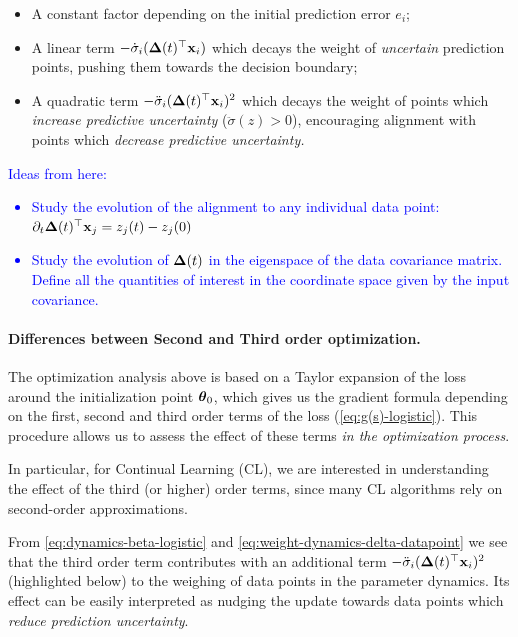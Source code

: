 \documentclass{article} %
\begin{document}
\begin{itemize}
    \item A constant factor depending on the initial prediction error $e_i$; 
    \item A linear term $- \dot\sigma_i (\mbox{$\mbox{$\boldsymbol{\Delta}$}$}(t)^\top \mbox{$\mbox{$\mathbf{x}$}$}_i)$ which decays the weight of \emph{uncertain} prediction points, pushing them towards the decision boundary;
    \item A quadratic term $- \ddot\sigma_i (\mbox{$\mbox{$\boldsymbol{\Delta}$}$}(t)^\top \mbox{$\mbox{$\mathbf{x}$}$}_i)^2$ which decays the weight of points which \emph{increase predictive uncertainty} ($\ddot\sigma(z)>0$), encouraging alignment with points which \emph{decrease predictive uncertainty.}
\end{itemize}

\textcolor{blue}{Ideas from here: 
\begin{itemize}
    \item Study the evolution of the alignment to any individual data point: $\partial_t \mbox{$\mbox{$\boldsymbol{\Delta}$}$}(t)^\top\mbox{$\mbox{$\mathbf{x}$}$}_j = z_j(t) - z_j(0)$
    \item Study the evolution of $\mbox{$\mbox{$\boldsymbol{\Delta}$}$}(t)$ in the eigenspace of the data covariance matrix. Define all the quantities of interest in the coordinate space given by the input covariance. 
\end{itemize}
}


\paragraph{Differences between Second and Third order optimization.}
The optimization analysis above is based on a Taylor expansion of the loss around the initialization point $\mbox{$\mbox{$\boldsymbol{\theta}$}$}_0$, which gives us the gradient formula depending on the first, second and third order terms of the loss (\cref{eq:g(s)-logistic}). This procedure allows us to assess the effect of these terms \emph{in the optimization process}. 

In particular, for Continual Learning (CL), we are interested in understanding the effect of the third (or higher) order terms, since many CL algorithms rely on second-order approximations.

From \cref{eq:dynamics-beta-logistic} and \cref{eq:weight-dynamics-delta-datapoint} we see that the third order term contributes with an additional term $ - \ddot\sigma_i  (\mbox{$\mbox{$\boldsymbol{\Delta}$}$}(t)^\top \mbox{$\mbox{$\mathbf{x}$}$}_i)^2$ (highlighted below) to the weighing of data points in the parameter dynamics. Its effect can be easily interpreted as nudging the update towards data points which \emph{reduce prediction uncertainty}. 
\end{document}
